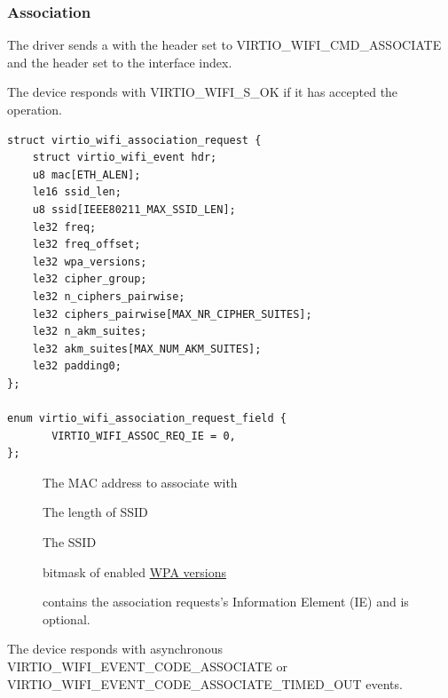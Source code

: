 \subsubsection{Association}\label{sec:Device Types / 802.11 Device / Device Operation / Association}

The driver sends a  with the header  set to VIRTIO_WIFI_CMD_ASSOCIATE and the header  set to the interface index.

The device responds with VIRTIO_WIFI_S_OK if it has accepted the operation.

\begin{lstlisting}
struct virtio_wifi_association_request {
	struct virtio_wifi_event hdr;
	u8 mac[ETH_ALEN];
	le16 ssid_len;
	u8 ssid[IEEE80211_MAX_SSID_LEN];
	le32 freq;
	le32 freq_offset;
	le32 wpa_versions;
	le32 cipher_group;
	le32 n_ciphers_pairwise;
	le32 ciphers_pairwise[MAX_NR_CIPHER_SUITES];
	le32 n_akm_suites;
	le32 akm_suites[MAX_NUM_AKM_SUITES];
	le32 padding0;
};

enum virtio_wifi_association_request_field {
       VIRTIO_WIFI_ASSOC_REQ_IE = 0,
};
\end{lstlisting}

\begin{description}
\item[] The MAC address to associate with
\item[] The length of SSID
\item[] The SSID
\item[] %
\item[] %
\item[] bitmask of enabled \hyperref[def:Device Types / 802.11 Device / Device Operation / Common Definitions / Interface Types / WPA versions]{WPA versions}
\item[] %
\item[] %
\item[] %
\item[] %
\item[] %
\item[] contains the association requests's Information Element (IE) and is optional.
\end{description}

The device responds with asynchronous VIRTIO_WIFI_EVENT_CODE_ASSOCIATE or
	VIRTIO_WIFI_EVENT_CODE_ASSOCIATE_TIMED_OUT events.

